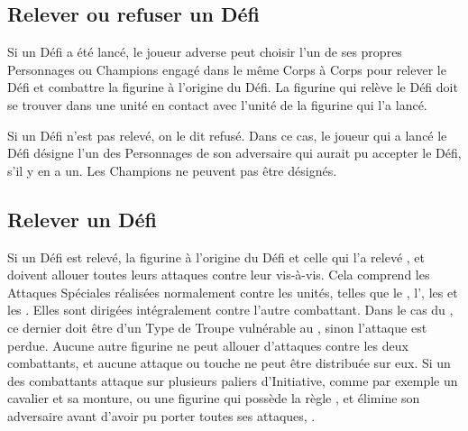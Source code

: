 \subsection{Relever ou refuser un Défi}

Si un Défi a été lancé, le joueur adverse peut choisir l'un de ses propres Personnages ou Champions engagé dans le même Corps à Corps pour relever le Défi et combattre la figurine à l'origine du Défi. La figurine qui relève le Défi doit se trouver dans une unité en contact avec l'unité de la figurine qui l'a lancé.

Si un Défi n'est pas relevé, on le dit refusé. Dans ce cas, le joueur qui a lancé le Défi désigne l'un des Personnages de son adversaire qui aurait pu accepter le Défi, s'il y en a un. Les Champions ne peuvent pas être désignés. 

\subsection{Relever un Défi}

Si un Défi est relevé, la figurine à l'origine du Défi et celle qui l'a relevé , et doivent allouer toutes leurs attaques contre leur vis-à-vis. Cela comprend les Attaques Spéciales réalisées normalement contre les unités, telles que le \stomp{}, l'\breathweapon{}, les \impacthits{} et les \grindingattacks{}. Elles sont dirigées intégralement contre l'autre combattant. Dans le cas du \stomp{}, ce dernier doit être d'un Type de Troupe vulnérable au \stomp{}, sinon l'attaque est perdue. Aucune autre figurine ne peut allouer d'attaques contre les deux combattants, et aucune attaque ou touche ne peut être distribuée sur eux. Si un des combattants attaque sur plusieurs paliers d'Initiative, comme par exemple un cavalier et sa monture, ou une figurine qui possède la règle \stomp{}, et élimine son adversaire avant d'avoir pu porter toutes ses attaques, .

